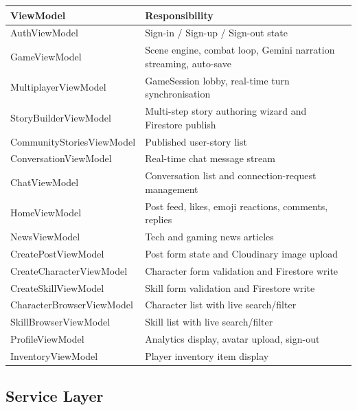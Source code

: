 \documentclass[12pt,a4paper]{article}
\begin{document}
\begin{center}
\begin{tabular}{>{\ttfamily\small}p{5.2cm} p{8.5cm}}
  \toprule
  \textbf{ViewModel} & \textbf{Responsibility} \\
  \midrule
  AuthViewModel             & Sign-in / Sign-up / Sign-out state \\
  GameViewModel             & Scene engine, combat loop, Gemini narration streaming, auto-save \\
  MultiplayerViewModel      & GameSession lobby, real-time turn synchronisation \\
  StoryBuilderViewModel     & Multi-step story authoring wizard and Firestore publish \\
  CommunityStoriesViewModel & Published user-story list \\
  ConversationViewModel     & Real-time chat message stream \\
  ChatViewModel             & Conversation list and connection-request management \\
  HomeViewModel             & Post feed, likes, emoji reactions, comments, replies \\
  NewsViewModel             & Tech and gaming news articles \\
  CreatePostViewModel       & Post form state and Cloudinary image upload \\
  CreateCharacterViewModel  & Character form validation and Firestore write \\
  CreateSkillViewModel      & Skill form validation and Firestore write \\
  CharacterBrowserViewModel & Character list with live search/filter \\
  SkillBrowserViewModel     & Skill list with live search/filter \\
  ProfileViewModel          & Analytics display, avatar upload, sign-out \\
  InventoryViewModel        & Player inventory item display \\
  \bottomrule
\end{tabular}
\end{center}

\subsection{Service Layer}
\end{document}
